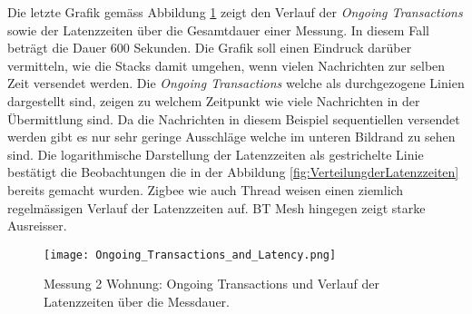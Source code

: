 \newpage
Die letzte Grafik gemäss Abbildung \ref{fig:OngoingTransactions} zeigt den Verlauf der \textit{Ongoing Transactions} sowie der Latenzzeiten über die Gesamtdauer einer Messung.
In diesem Fall beträgt die Dauer 600 Sekunden.
Die Grafik soll einen Eindruck darüber vermitteln, wie die Stacks damit umgehen, wenn vielen Nachrichten zur selben Zeit versendet werden.
Die \textit{Ongoing Transactions} welche als durchgezogene Linien dargestellt sind, zeigen zu welchem Zeitpunkt wie viele Nachrichten in der Übermittlung sind.
Da die Nachrichten in diesem Beispiel sequentiellen versendet werden gibt es nur sehr geringe Ausschläge welche im unteren Bildrand zu sehen sind.
Die logarithmische Darstellung der Latenzzeiten als gestrichelte Linie bestätigt die Beobachtungen die in der Abbildung \ref{fig:VerteilungderLatenzzeiten} bereits gemacht wurden.
Zigbee wie auch Thread weisen einen ziemlich regelmässigen Verlauf der Latenzzeiten auf.
BT Mesh hingegen zeigt starke Ausreisser.

\begin{figure}[H]
	\centering
	\texttt{[image: Ongoing\_Transactions\_and\_Latency.png]}
	\caption{Messung 2 Wohnung: Ongoing Transactions und Verlauf der Latenzzeiten über die Messdauer.}
	\label{fig:OngoingTransactions}
\end{figure}
